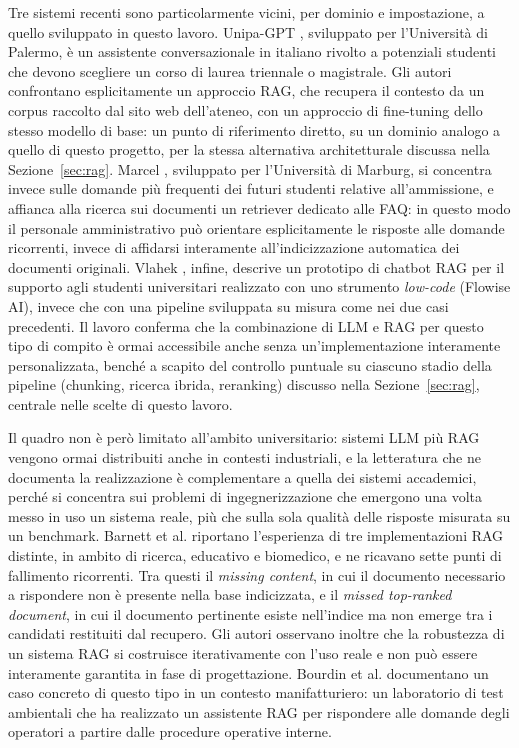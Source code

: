 Tre sistemi recenti sono particolarmente vicini, per dominio e impostazione, a quello sviluppato in questo lavoro.
Unipa-GPT \cite{siragusa2024unipagpt}, sviluppato per l'Università di Palermo, è un assistente conversazionale in
italiano rivolto a potenziali studenti che devono scegliere un corso di laurea triennale o magistrale. Gli autori
confrontano esplicitamente un approccio RAG, che recupera il contesto da un corpus raccolto dal sito web
dell'ateneo, con un approccio di fine-tuning dello stesso modello di base: un punto di riferimento diretto, su un
dominio analogo a quello di questo progetto, per la stessa alternativa architetturale discussa nella
Sezione~\ref{sec:rag}. Marcel \cite{trienes2025marcel}, sviluppato per l'Università di Marburg, si concentra invece
sulle domande più frequenti dei futuri studenti relative all'ammissione, e affianca alla ricerca sui documenti un
retriever dedicato alle FAQ: in questo modo il personale amministrativo può orientare esplicitamente le risposte
alle domande ricorrenti, invece di affidarsi interamente all'indicizzazione automatica dei documenti originali.
Vlahek \cite{vlahek2024chatbot}, infine, descrive un prototipo di chatbot RAG per il supporto agli studenti
universitari realizzato con uno strumento \emph{low-code} (Flowise AI), invece che con una pipeline sviluppata su
misura come nei due casi precedenti. Il lavoro conferma che la combinazione di LLM e RAG per questo tipo di compito
è ormai accessibile anche senza un'implementazione interamente personalizzata, benché a scapito del controllo
puntuale su ciascuno stadio della pipeline (chunking, ricerca ibrida, reranking) discusso nella
Sezione~\ref{sec:rag}, centrale nelle scelte di questo lavoro.

Il quadro non è però limitato all'ambito universitario: sistemi LLM più RAG vengono ormai distribuiti anche in
contesti industriali, e la letteratura che ne documenta la realizzazione è complementare a quella dei sistemi
accademici, perché si concentra sui problemi di ingegnerizzazione che emergono una volta messo in uso un sistema
reale, più che sulla sola qualità delle risposte misurata su un benchmark. Barnett et al.
\cite{barnett2024sevenfailures} riportano l'esperienza di tre implementazioni RAG distinte, in ambito di ricerca,
educativo e biomedico, e ne ricavano sette punti di fallimento ricorrenti. Tra questi il \emph{missing content}, in
cui il documento necessario a rispondere non è presente nella base indicizzata, e il \emph{missed top-ranked
document}, in cui il documento pertinente esiste nell'indice ma non emerge tra i candidati restituiti dal recupero.
Gli autori osservano inoltre che la robustezza di un sistema RAG si costruisce iterativamente con l'uso reale e non
può essere interamente garantita in fase di progettazione. Bourdin et al. \cite{bourdin2025easirag} documentano un
caso concreto di questo tipo in un contesto manifatturiero: un laboratorio di test ambientali che ha realizzato un
assistente RAG per rispondere alle domande degli operatori a partire dalle procedure operative interne.

